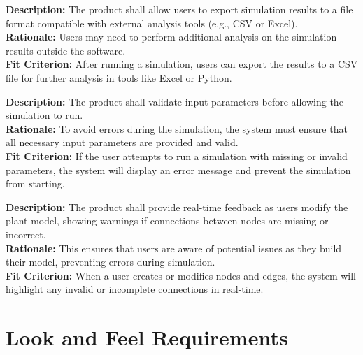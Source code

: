 \documentclass[12pt]{article}
\begin{document}
\vspace{0.5cm}

\begin{tcolorbox}[title=FR8]
\textbf{Description:} The product shall allow users to export simulation results to a file format compatible with external analysis tools (e.g., CSV or Excel). \\
\textbf{Rationale:} Users may need to perform additional analysis on the simulation results outside the software. \\
\textbf{Fit Criterion:} After running a simulation, users can export the results to a CSV file for further analysis in tools like Excel or Python.
\end{tcolorbox}

\vspace{0.5cm}

\begin{tcolorbox}[title=FR9]
\textbf{Description:} The product shall validate input parameters before allowing the simulation to run. \\
\textbf{Rationale:} To avoid errors during the simulation, the system must ensure that all necessary input parameters are provided and valid. \\
\textbf{Fit Criterion:} If the user attempts to run a simulation with missing or invalid parameters, the system will display an error message and prevent the simulation from starting.
\end{tcolorbox}

\vspace{0.5cm}

\begin{tcolorbox}[title=FR10]
\textbf{Description:} The product shall provide real-time feedback as users modify the plant model, showing warnings if connections between nodes are missing or incorrect. \\
\textbf{Rationale:} This ensures that users are aware of potential issues as they build their model, preventing errors during simulation. \\
\textbf{Fit Criterion:} When a user creates or modifies nodes and edges, the system will highlight any invalid or incomplete connections in real-time.
\end{tcolorbox}


\section{Look and Feel Requirements}
\end{document}
